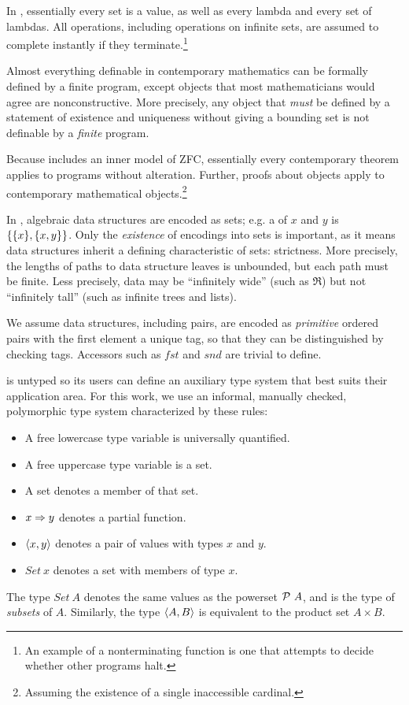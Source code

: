 \documentclass[preprint]{sigplanconf}
\begin{document}
In \lzfclang, essentially every set is a value, as well as every lambda and every set of lambdas.
All operations, including operations on infinite sets, are assumed to complete instantly if they terminate.\footnote{An
example of a nonterminating \lzfclang function is one that attempts to decide whether other \lzfclang programs halt.}

Almost everything definable in contemporary mathematics can be formally defined by a finite \lzfclang program, except objects that most mathematicians would agree are nonconstructive.
More precisely, any object that \emph{must} be defined by a statement of existence and uniqueness without giving a bounding set is not definable by a \emph{finite} \lzfclang program.

Because \lzfclang includes an inner model of ZFC, essentially every contemporary theorem applies to \lzfclang programs without alteration.
Further, proofs about \lzfclang objects apply to contemporary mathematical objects.\footnote{Assuming the existence of a single inaccessible cardinal.}

In \lzfclang, algebraic data structures are encoded as sets; e.g. a  of $x$ and $y$ is $\{{\{{x}\},\{{x,y}\}}\}$.
Only the \emph{existence} of encodings into sets is important, as it means data structures inherit a defining characteristic of sets: strictness.
More precisely, the lengths of paths to data structure leaves is unbounded, but each path must be finite.
Less precisely, data may be ``infinitely wide'' (such as $\Re$) but not ``infinitely tall'' (such as infinite trees and lists).

We assume data structures, including pairs, are encoded as \emph{primitive} ordered pairs with the first element a unique tag, so that they can be distinguished by checking tags.
Accessors such as $fst$ and $snd$ are trivial to define.

\lzfclang is untyped so its users can define an auxiliary type system that best suits their application area.
For this work, we use an informal, manually checked, polymorphic type system characterized by these rules:
\begin{itemize}
	\item A free lowercase type variable is universally quantified.
	\item A free uppercase type variable is a set.
	\item A set denotes a member of that set.
	\item $x \Rightarrow y$ denotes a partial function.
	\item $\left\langle{x,y}\right\rangle$ denotes a pair of values with types $x$ and $y$.
	\item $Set~x$ denotes a set with members of type $x$.
\end{itemize}
The type $Set~A$ denotes the same values as the powerset $\mathcal{P}~A$, and is the type of \emph{subsets} of $A$.
Similarly, the type $\left\langle{A,B}\right\rangle$ is equivalent to the product set $A \times B$.
\end{document}
